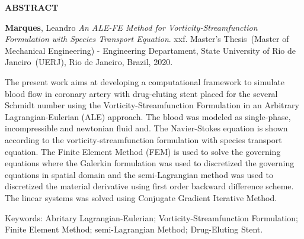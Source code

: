 \begin{center}
\textbf{ABSTRACT}
\end{center}


$\!$\\

\hspace{-1.3cm}\textbf{Marques}, Leandro \textit{An ALE-FE Method for Vorticity-Streamfunction Formulation with Species Transport Equation}. xxf. Master's Thesis~(Master of Mechanical Engineering) - Engineering Departament, State University of Rio de Janeiro~(UERJ), Rio de Janeiro, Brazil, 2020.

\vspace{.2cm}

\indent 
The present work aims at developing a 
computational framework to simulate blood flow 
in coronary artery with
drug-eluting stent placed for the several Schmidt number using the Vorticity-Streamfunction 
Formulation in an Arbitrary Lagrangian-Eulerian (ALE) approach.
The blood was modeled as single-phase, incompressible 
and newtonian fluid and. The Navier-Stokes equation is 
shown according to the vorticity-streamfunction 
formulation with species transport equation.
The Finite Element Method (FEM) is used to solve 
the governing equations where the Galerkin formulation was used
to discretized the governing equations in spatial domain 
and the semi-Lagrangian method was used to discretized 
the material derivative using first order backward difference scheme. 
The linear systems was solved using Conjugate Gradient Iterative Method.

\vspace{1cm}

\hspace{-1.3cm}Keywords: Abritary Lagrangian-Eulerian; Vorticity-Streamfunction Formulation; Finite Element Method; semi-Lagrangian Method; Drug-Eluting Stent.
